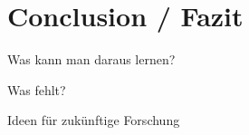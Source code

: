 \chapter{Conclusion / Fazit}
\label{ch:conclusion}

Was kann man daraus lernen?

Was fehlt?

Ideen für zukünftige Forschung

